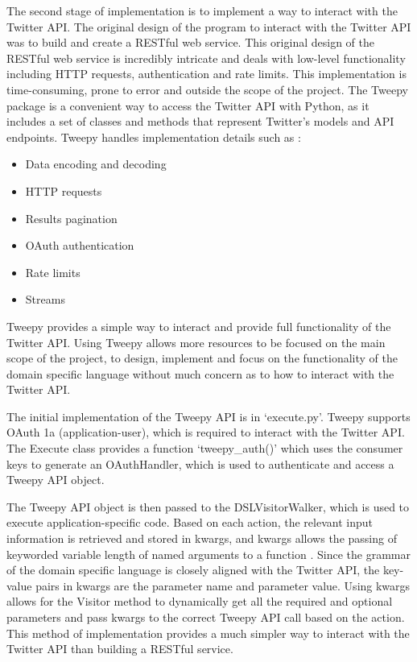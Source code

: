 The second stage of implementation is to implement a way to interact with the Twitter API. The original design of the program to interact with the Twitter API was to build and create a RESTful web service. This original design of the RESTful web service is incredibly intricate and deals with low-level functionality including HTTP requests, authentication and rate limits. This implementation is time-consuming, prone to error and outside the scope of the project. The Tweepy package is a convenient way to access the Twitter API with Python, as it includes a set of classes and methods that represent Twitter's models and API endpoints. Tweepy handles implementation details such as \cite{api}:
\begin{itemize}
    \item Data encoding and decoding
    \item HTTP requests
    \item Results pagination
    \item OAuth authentication
    \item Rate limits
    \item Streams
\end{itemize}
Tweepy provides a simple way to interact and provide full functionality of the Twitter API. Using Tweepy allows more resources to be focused on the main scope of the project, to design, implement and focus on the functionality of the domain specific language without much concern as to how to interact with the Twitter API. \newline \par

The initial implementation of the Tweepy API is in `execute.py'. Tweepy supports OAuth 1a (application-user), which is required to interact with the Twitter API. The Execute class provides a function `tweepy\_auth()' which uses the consumer keys to generate an OAuthHandler, which is used to authenticate and access a Tweepy API object. \newline \par

The Tweepy API object is then passed to the DSLVisitorWalker, which is used to execute application-specific code. Based on each action, the relevant input information is retrieved and stored in kwargs, and kwargs allows the passing of keyworded variable length of named arguments to a function \cite{args}. Since the grammar of the domain specific language is closely aligned with the Twitter API, the key-value pairs in kwargs are the parameter name and parameter value. Using kwargs allows for the Visitor method to dynamically get all the required and optional parameters and pass kwargs to the correct Tweepy API call based on the action. This method of implementation provides a much simpler way to interact with the Twitter API than building a RESTful service. \newline \par

